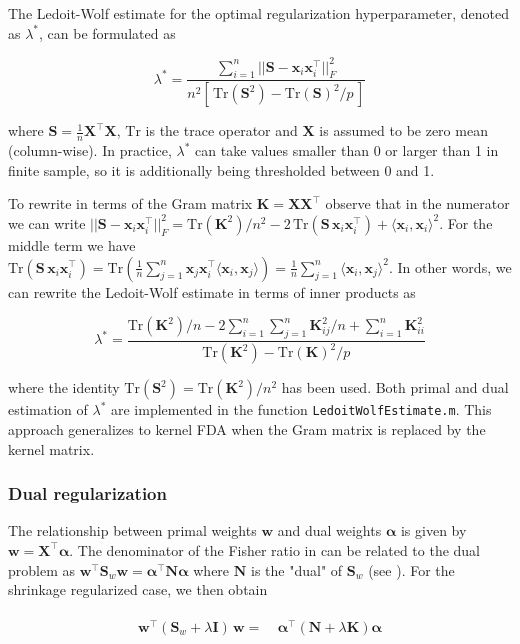 \documentclass[utf8]{frontiersSCNS} %
\newcommand{\al}{\boldsymbol{\alpha}}
\newcommand{\w}{\mathbf{w}}
\newcommand{\x}{\mathbf{x}}
\newcommand{\I}{\mathbf{I}}
\newcommand{\K}{\mathbf{K}}
\renewcommand{\S}{\mathbf{S}}
\newcommand{\Tr}[1]{\text{Tr}(#1)}
\newcommand{\X}{\mathbf{X}}
\newcommand{\ttt}[1]{\texttt{#1}}
\begin{document}
The Ledoit-Wolf estimate \citep{Ledoit2003HoneyMatrix,Blankertz2011} for the optimal regularization hyperparameter, denoted as $\lambda^*$, can be formulated as 

\begin{equation}\label{eq:LedoitWolf}
\lambda^* = \frac{\sum_{i=1}^n ||\S - \x_i\x_i^\top||_F^2}%
{n^2 [\,\Tr{\S^2} - \Tr{\S}^2/p\,]}
\end{equation}

where $\mathbf{S}= \frac{1}{n}\X^\top\X$, $\text{Tr}$ is the trace operator and $\X$ is assumed to be zero mean (column-wise). In practice, $\lambda^*$ can take values smaller than 0 or larger than 1 in finite sample, so it is additionally being thresholded between 0 and 1. 

To rewrite  in terms of the Gram matrix $\K= \X\X^\top$ observe that in the numerator we can write $||\S - \x_i\x_i^\top||_F^2 = \Tr{\K^2}/n^2 - 2\,\Tr{\S\,\x_i\x_i^\top} + \langle\x_i,\x_i\rangle^2$. For the middle term we have $\Tr{\S\,\x_i\x_i^\top} = \Tr{\frac{1}{n}\sum_{j=1}^n \x_j\x_i^\top\langle\x_i,\x_j\rangle} = \frac{1}{n}\sum_{j=1}^n \langle\x_i,\x_j\rangle^2$. In other words, we can rewrite the Ledoit-Wolf estimate in terms of inner products as 

\begin{equation}\label{eq:LedoitWolfDual}
\lambda^* = \frac{\Tr{\K^2}/n - 2\sum_{i=1}^n\sum_{j=1}^n \K_{ij}^2/n + \sum_{i=1}^n \K_{ii}^2 }%
{\Tr{\K^2} - \Tr{\K}^2/p}
\end{equation}

where the identity $\Tr{\S^2} = \Tr{\K^2}/n^2$ has been used. Both primal and dual estimation of $\lambda^*$ are implemented in the function \ttt{LedoitWolfEstimate.m}. This approach generalizes to kernel FDA when the Gram matrix is replaced by the kernel matrix.


\subsubsection{Dual regularization}

The relationship between primal weights $\w$ and dual weights $\al$ is given by $\w = \X^\top\al$. The denominator of the Fisher ratio in  can be related to the dual problem as $\w^\top\S_w\w = \al^\top\mathbf{N}\al$ where $\mathbf{N}$ is the "dual" of $\S_w$ (see ). For the shrinkage regularized case, we then obtain 

\begin{align}
\begin{split}
\label{eq:dualLDA}
\w^\top(\S_w + \lambda\I)\,\w =&\ \al^\top(\mathbf{N} + \lambda\K)\al
\end{split}
\end{align}
\end{document}

